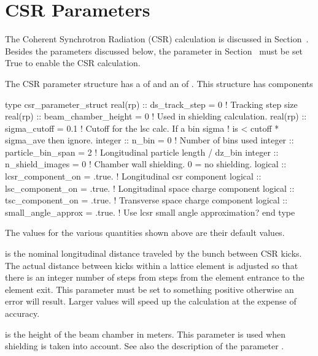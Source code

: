 {{{{{{{{%
\section{CSR Parameters}
\label{s:csr.params}

The Coherent Synchrotron Radiation (CSR) calculation is discussed in
Section~. Besides the parameters discussed below, the
 parameter in Section~
must be set True to enable the CSR calculation.

The CSR parameter structure has a 
of  and an  of .
This structure has components
\begin{example}
  type csr_parameter_struct 
    real(rp) :: ds_track_step = 0          ! Tracking step size
    real(rp) :: beam_chamber_height = 0    ! Used in shielding calculation.
    real(rp) :: sigma_cutoff = 0.1         ! Cutoff for the lsc calc. If a bin sigma
                                           !  is < cutoff * sigma_ave then ignore.
    integer :: n_bin = 0                   ! Number of bins used
    integer :: particle_bin_span = 2       ! Longitudinal particle length / dz_bin
    integer :: n_shield_images = 0         ! Chamber wall shielding. 0 = no shielding.
    logical :: lcsr_component_on = .true.  ! Longitudinal csr component
    logical :: lsc_component_on = .true.   ! Longitudinal space charge component
    logical :: tsc_component_on = .true.   ! Transverse space charge component
    logical :: small_angle_approx = .true. ! Use lcsr small angle approximation?
  end type
\end{example}
The values for the various quantities shown above are their default values. 

 is the nominal longitudinal distance traveled by
the bunch between CSR kicks. The actual distance between kicks within
a lattice element is adjusted so that there is an integer number of
steps from steps from the element entrance to the element exit.  This
parameter must be set to something positive otherwise an error will
result. Larger values will speed up the calculation at the expense of
accuracy.

 is the height of the beam chamber in
meters. This parameter is used when shielding is taken into account.
See also the description of the parameter .

}}}}}}}}
